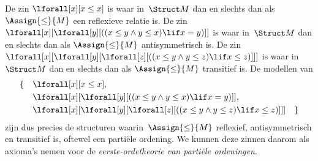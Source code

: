 \documentclass[../../../include/open-logic-section]{subfiles}
\begin{document}
\begin{ex}
De zin $\lforall[x][x \le x]$ is waar in~$\Struct M$ dan en slechts
dan als $\Assign{\le}{M}$ een reflexieve relatie is. De zin
$\lforall[x][\lforall[y][((x \le y \land y \le x) \lif x = y)]]$ is
waar in~$\Struct M$ dan en slechts dan als $\Assign{\le}{M}$
antisymmetrisch is. De zin
$\lforall[x][\lforall[y][\lforall[z][((x \le y \land y \le z)
      \lif x \le z)]]]$ is waar in~$\Struct M$ dan en slechts dan als
$\Assign{\le}{M}$ transitief is. De modellen van
\begin{align*}
\{\quad &\lforall[x][x \le x], \\
   & \lforall[x][\lforall[y][((x \le y \land y \le
    x) \lif x = y)]], \\
   &\lforall[x][\lforall[y][\lforall[z][((x \le y
      \land y \le z) \lif x \le z)]]] \quad \}
\end{align*}
zijn dus precies de structuren waarin~$\Assign{\le}{M}$ reflexief,
antisymmetrisch en transitief is, oftewel een partiële ordening. We
kunnen deze zinnen daarom als axioma's nemen voor de
\emph{eerste-ordetheorie van partiële ordeningen}.
\end{ex}
\end{document}

